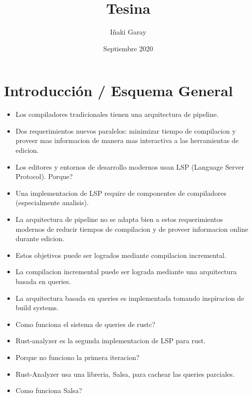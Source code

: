 \documentclass[12pt, a4paper]{report}
\title{Tesina}
\author{Iñaki Garay}
\date{Septiembre 2020}
\begin{document}
\begin{titlepage}
\maketitle
\thispagestyle{empty}
\end{titlepage}

\tableofcontents
\thispagestyle{empty}

\newpage

\chapter*{Introducción / Esquema General}

  \begin{itemize}[noitemsep]

    \item Los compiladores tradicionales tienen una arquitectura de pipeline.

    \item Dos requerimientos nuevos paralelos: minimizar tiempo de compilacion y proveer mas informacion de manera mas interactiva a las herramientas de edicion.

    \item Los editores y entornos de desarrollo modernos usan LSP (Language Server Protocol). Porque?

    \item Una implementacion de LSP require de componentes de compiladores (especialmente analisis).

    \item La arquitectura de pipeline no se adapta bien a estos requerimientos modernos de reducir tiempos de compilacion y de proveer informacion online durante edicion.

    \item Estos objetivos puede ser logrados mediante compilacion incremental.

    \item La compilacion incremental puede ser lograda mediante una arquitectura basada en queries.

    \item La arquitectura basada en queries es implementada tomando inspiracion de build systems.

    \item Como funciona el sistema de queries de rustc?

    \item Rust-analyzer es la segunda implementacion de LSP para rust.

    \item Porque no funciono la primera iteracion?

    \item Rust-Analyzer usa una libreria, Salsa, para cachear las queries parciales.

    \item Como funciona Salsa?

  \end{itemize}
\end{document}
